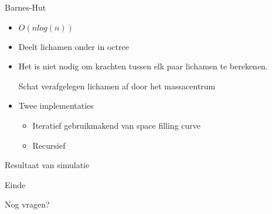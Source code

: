 \documentclass{beamer}
\begin{document}
	\begin{frame}{Barnes-Hut}
		\note{
			
		}
		\begin{itemize}
			\item $O(n log(n))$
			\item Deelt lichamen onder in octree
			\item Het is niet nodig om krachten tussen elk paar lichamen te berekenen.
			
			 Schat verafgelegen lichamen af door het massacentrum
			
			\item Twee implementaties
			\begin{itemize}
				\item Iteratief gebruikmakend van space filling curve
				\item Recursief
			\end{itemize}
		\end{itemize}
		\codeBH
	\end{frame}
	
%
%
%
%
	
	\begin{frame}{Resultaat van simulatie}
		\begin{center}
		\end{center}
	\end{frame}
	
	\begin{frame}{Einde}
		\begin{center}
			Nog vragen?
		\end{center}
	\end{frame}
	
\end{document}
